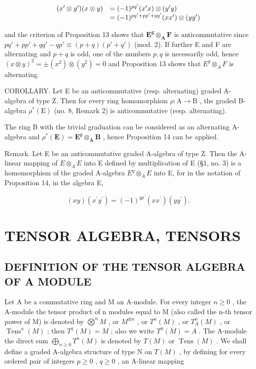 \[
\begin{array}{r l} (x ^ {\prime} \otimes y ^ {\prime}) (x \otimes y) & = (- 1) ^ {p q ^ {\prime}} (x ^ {\prime} x) \otimes (y ^ {\prime} y) \\ & = (- 1) ^ {p q ^ {\prime} + p p ^ {\prime} + q q ^ {\prime}} (x x ^ {\prime}) \otimes (y y ^ {\prime}) \end{array}
\]

and the criterion of Proposition 13 shows that \(\mathbf{E}^{\mathbf{g}}\otimes_{\mathbf{A}}\mathbf{F}\) is anticommutative since \(pq' + p p' + qq' - q p' \equiv (p + q)(p' + q')\) (mod. 2). If further E and F are alternating and \(p + q\) is odd, one of the numbers \(p, q\) is necessarily odd, hence \((x \otimes y)^2 = \pm (x^2) \otimes (y^2) = 0\) and Proposition 13 shows that \(E^g \otimes_A F\) is alternating.

COROLLARY. Let E be an anticommutative (resp. alternating) graded A-algebra of type Z. Then for every ring homomorphism \(\rho: \mathrm{A} \to \mathrm{B}\) , the graded B-algebra \(\rho^{*}(\mathrm{E})\) (no. 8, Remark 2) is anticommutative (resp. alternating).

The ring B with the trivial graduation can be considered as an alternating A-algebra and \(\rho^{*}(\mathbf{E}) = \mathbf{E}^{\mathfrak{g}}\otimes_{\mathbf{A}}\mathbf{B}\) , hence Proposition 14 can be applied.

Remark. Let E be an anticommutative graded A-algebra of type Z. Then the A-linear mapping of \(E \otimes_{A} E\) into E defined by multiplication of E (§1, no. 3) is a homomorphism of the graded A-algebra \(E^{g} \otimes_{A} E\) into E, for in the notation of Proposition 14, in the algebra E,

\[
(x y) (x ^ {\prime} y ^ {\prime}) = (- 1) ^ {q p ^ {\prime}} (x x ^ {\prime}) (y y ^ {\prime}).
\]

\section{TENSOR ALGEBRA, TENSORS}

\subsection{DEFINITION OF THE TENSOR ALGEBRA OF A MODULE}

Let A be a commutative ring and M an A-module. For every integer \(n \geqslant 0\) , the A-module the tensor product of n modules equal to M (also called the n-th tensor power of M) is denoted by \(\bigotimes^{n} M\) , or \(M^{\otimes n}\) , or \(T^{n}(M)\) , or \(T_{A}^{n}(M)\) , or \(\operatorname{Tens}^{n}(M)\) ; then \(T^{1}(M) = M\) ; also we write \(T^{0}(M) = A\) . The A-module the direct sum \(\bigoplus_{n \geqslant 0} T^{n}(M)\) is denoted by \(T(M)\) or \(\operatorname{Tens}(M)\) . We shall define a graded A-algebra structure of type N on \(T(M)\) , by defining for every ordered pair of integers \(p \geqslant 0\) , \(q \geqslant 0\) , an A-linear mapping

